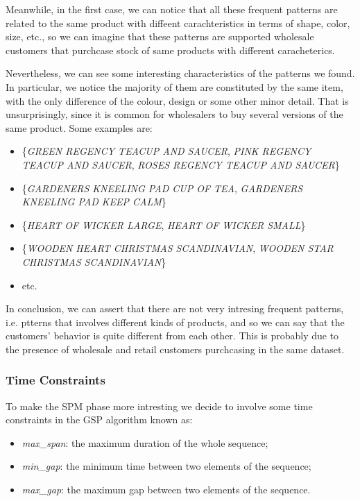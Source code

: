 Meanwhile, in the first case, we can notice that all these frequent patterns are related to the same product with diffeent carachteristics in terms of shape, color, size, etc., so we can imagine that these patterns are supported wholesale customers that purchcase stock of same products with different caracheterics.

Nevertheless, we can see some interesting characteristics of the patterns we found.\\
In particular, we notice the majority of them are constituted by the same item, with the only difference of the colour, design or some other minor detail. That is unsurprisingly, since it is common for wholesalers to buy several versions of the same product. Some examples are:

\begin{itemize}
\item \{\emph{GREEN REGENCY TEACUP AND SAUCER}, \emph{PINK REGENCY TEACUP AND SAUCER}, \emph{ROSES REGENCY TEACUP AND SAUCER}\}
\item \{\emph{GARDENERS KNEELING PAD CUP OF TEA}, \emph{GARDENERS KNEELING PAD KEEP CALM}\}
\item \{\emph{HEART OF WICKER LARGE}, \emph{HEART OF WICKER SMALL}\}
\item \{\emph{WOODEN HEART CHRISTMAS SCANDINAVIAN}, \emph{WOODEN STAR CHRISTMAS SCANDINAVIAN}\}
\item etc.
\end{itemize}

In conclusion, we can assert that there are not very intresing frequent patterns, i.e. ptterns that involves different kinds of products, and so we can say that the customers' behavior is quite different from each other. This is probably due to the presence of wholesale and retail customers purchcasing in the same dataset.

\subsubsection{Time Constraints}
To make the SPM phase more intresting we decide to involve some time constraints in the GSP algorithm known as:

\begin{itemize}
\item \emph{max\_span}: the maximum duration of the whole sequence;
\item \emph{min\_gap}: the minimum time between two elements of the sequence;
\item \emph{max\_gap}: the maximum gap between two elements of the sequence.
\end{itemize}

